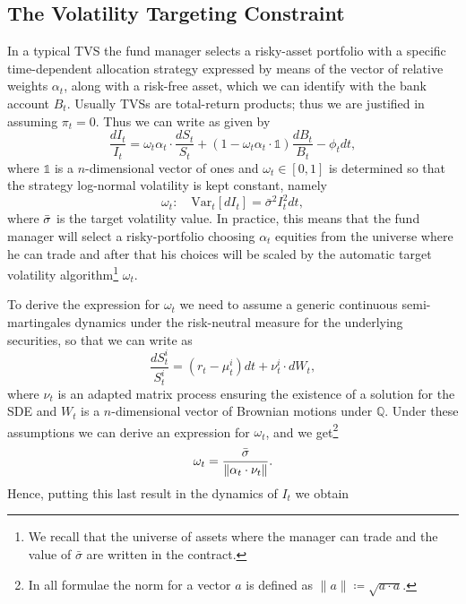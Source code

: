 \documentclass[11pt]{article}
\begin{document}
\subsection{The Volatility Targeting Constraint}
In a typical TVS the fund manager selects a risky-asset portfolio with a specific time-dependent allocation strategy expressed by means of the vector of relative weights $\alpha_t$, along with a risk-free asset, which we can identify with the bank account $B_t$. Usually TVSs are total-return products; thus we are justified in assuming $\pi_t=0$. Thus we can write  as given by
\begin{equation}
    \frac{dI_t}{I_t}= \omega_t \alpha_t \cdot \frac{dS_t}{S_t} + \left(1-\omega_t  \alpha_t \cdot \mathds{1} \right)\frac{dB_t}{B_t}- \phi_t dt,
\label{TVS_elegant}\end{equation}
where $\mathds{1}$ is a $n$-dimensional vector of ones and $\omega_t\in[0,1]$ is determined so that the strategy log-normal volatility is kept constant, namely
\begin{equation}
        \omega_t: \quad \mathrm{Var}_t[dI_t] = \bar{\sigma}^2I_t^2dt,
\end{equation}
where $\Bar{\sigma}$ is the target volatility value.
In practice, this means that the fund manager will select a risky-portfolio choosing $\alpha_t$ equities from the universe where he can trade and after that his choices will be scaled by the automatic target volatility algorithm\footnote{We recall that the universe of assets where the manager can trade and the value of $\bar{\sigma}$ are written in the contract.} $\omega_t$.

To derive the expression for $\omega_t$ we need to assume a generic continuous semi-martingales dynamics under the risk-neutral measure for the underlying securities, so that we can write  as 
\begin{equation}
    \frac{dS_t^i}{S_t^i} = \left(r_t - \mu_t^i \right)dt + \nu_t^i \cdot dW_t,
\label{Equity_process}\end{equation}
where $\nu_t$ is an adapted matrix process ensuring the existence of a solution for the SDE and $W_t$ is a $n$-dimensional vector of Brownian motions under $\mathbb{Q}$. Under these assumptions we can derive an expression for $\omega_t$, and we get\footnote{In all formulae the norm for a vector $a$ is defined as $\|a\|\coloneqq\sqrt{a\cdot a}$.}
\begin{equation}
    \omega_t = \frac{\Bar{\sigma}}{\|\alpha_t\cdot \nu_t \|}.
\end{equation}
Hence, putting this last result in the dynamics of $I_t$ we obtain
\end{document}
